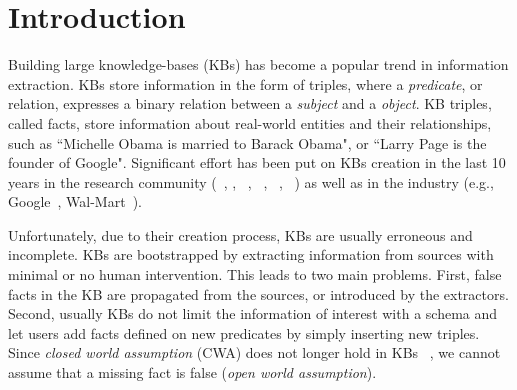 \section{Introduction}

Building large 
knowledge-bases (KBs) has become a popular trend in information extraction.
KBs store information in the form of triples, where a \emph{predicate}, or relation, expresses a binary relation between a \emph{subject} and a \emph{object}. KB triples, called facts, store information about real-world entities and their relationships, such as %
``Michelle Obama is married to Barack Obama", or ``Larry Page is the founder of Google".
Significant effort has been put on KBs creation in the last 10 years in the research community (~\cite{bizer2009dbpedia}, \cite{bollacker2008freebase}, ~\cite{vrandevcic2014wikidata}, \deepdive~\cite{shin2015incremental}, ~\cite{suchanek2007yago}, 
~\cite{banko2007open}) as well as in the industry %
(e.g., 
Google~\cite{dong2014data}, Wal-Mart~\cite{deshpande2013building}).

Unfortunately, due to their creation process, KBs are usually erroneous and incomplete.
KBs are bootstrapped by extracting information from sources 
with minimal or no human intervention.  This leads to two main problems. First, false facts in the KB are propagated from the sources, or introduced by the extractors. Second, usually KBs do not limit the information of interest with a schema
and let users add facts defined on new predicates by simply inserting new triples. %
Since \emph{closed world assumption} (CWA) does not longer hold in KBs ~\cite{dong2014data,galarraga2015fast}, we cannot assume that a missing fact is false %
(\emph{open world assumption}).

